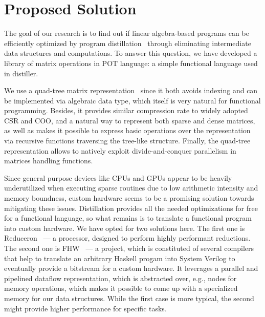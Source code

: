 \section{Proposed Solution}

The goal of our research is to find out if linear algebra-based programs can be efficiently optimized by program distillation~\cite{hamilton2021700} through eliminating intermediate data structures and computations.
To answer this question, we have developed a library of matrix operations
 in POT language: a simple functional language used in distiller.%

We use a quad-tree matrix representation~\cite{qtree} since it both avoids indexing and can be implemented via algebraic data type, which itself is very natural for functional programming.
Besides, it provides similar compression rate to widely adopted CSR and COO, and a natural way to represent both sparse and dense matrices, as well as makes it possible to express basic operations over the representation via recursive functions traversing the tree-like structure.
Finally, the quad-tree representation allows to natively exploit divide-and-conquer parallelism in matrices handling functions.

%
%  
%    
%    

Since general purpose devices like CPUs and GPUs appear to be heavily underutilized when executing sparse routines due to low arithmetic intensity and memory boundness, custom hardware seems to be a promising solution towards mitigating these issues. 
Distillation provides all the needed optimizations for free for a functional language, so what remains is to translate a functional program into custom hardware. We have opted for two solutions here.
The first one is Reduceron~\cite{naylorRunciman2012} --- a processor, designed to perform highly performant reductions.
The second one is FHW~\cite{Edwards2019FHWP} --- a project, which is constituted of several compilers that help to translate an arbitrary Haskell progam into System Verilog to eventually provide a bitstream for a custom hardware.
It leverages a parallel and pipelined dataflow representation, which is abstracted over, e.g., nodes for memory operations, which makes it possible to come up with a specialized memory for our data structures.
While the first case is more typical, the second might provide higher performance for specific tasks.


